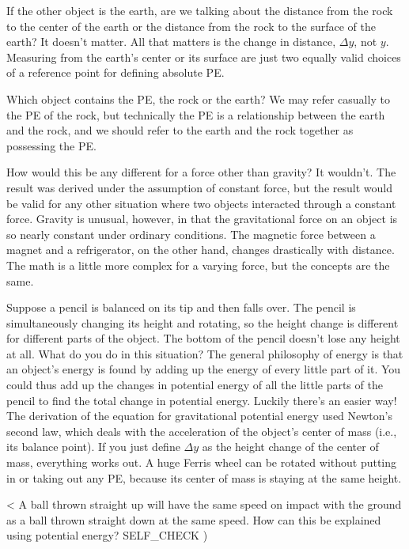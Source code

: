 \qandaquestion If the other object is the earth, are we talking
about the distance from the rock to the center of the earth
or the distance from the rock to the surface of the earth?
\qandaanswer It doesn't matter. All that matters is the change in
distance, $\Delta y$, not $y$. Measuring from the earth's
center or its surface are just two equally valid choices of
a reference point for defining absolute PE.

\qandaquestion Which object contains the PE, the rock or the earth?
\qandaanswer We may refer casually to the PE of the rock, but
technically the PE is a relationship between the earth and
the rock, and we should refer to the earth and the rock
together as possessing the PE.

\qandaquestion How would this be any different for a force other than gravity?
\qandaanswer It wouldn't. The result was derived under the
assumption of constant force, but the result would be valid
for any other situation where two objects interacted through
a constant force. Gravity is unusual, however, in that the
gravitational force on an object is so nearly constant under
ordinary conditions. The magnetic force between a magnet and
a refrigerator, on the other hand, changes drastically with
distance. The math is a little more complex for a varying
force, but the concepts are the same.

\qandaquestion Suppose a pencil is balanced on its tip and then
falls over. The pencil is simultaneously changing its height
and rotating, so the height change is different for
different parts of the object. The bottom of the pencil
doesn't lose any height at all. What do you do in this situation?
\qandaanswer The general philosophy of energy is that an object's
energy is found by adding up the energy of every little part
of it. You could thus add up the changes in potential energy
of all the little parts of the pencil to find the total
change in potential energy. Luckily there's an easier way!
The derivation of the equation for gravitational potential
energy used Newton's second law, which deals with the
acceleration of the object's center of mass (i.e., its
balance point). If you just define $\Delta y$ as the height
change of the center of mass, everything works out. A huge
Ferris wheel can be rotated without putting in or taking out
any PE, because its center of mass is staying at the same height.

<%
A ball thrown straight up will have the same speed on impact
with the ground as a ball thrown straight down at the same
speed. How can this be explained using potential energy?
  SELF_CHECK
  ) %

